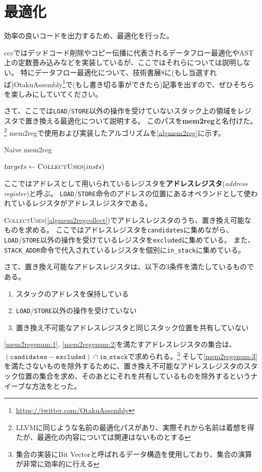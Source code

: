 \documentclass[uplatex,a4paper]{jsarticle}
\begin{document}
\clearpage
\section{最適化}
\label{optimization}

効率の良いコードを出力するため、最適化を行った。

cccではデッドコード削除やコピー伝播に代表されるデータフロー最適化やAST上の定数畳み込みなどを実装しているが、ここではそれらについては説明しない。
特にデータフロー最適化について、技術書展8に(もし当選すれば)OtakuAssembly\footnote{\url{https://twitter.com/OtakuAssembly}}で(もし書き切る事ができたら)記事を出すので、ぜひそちらを楽しみにしていてください。

さて、ここでは\texttt{LOAD}/\texttt{STORE}以外の操作を受けていないスタック上の領域をレジスタで置き換える最適化について説明する。
このパスを\textbf{mem2reg}と名付けた。\footnote{LLVMに同じような名前の最適化パスがあり、実際それから名前は着想を得たが、最適化の内容については関連はないものとする}
mem2regで使用および実装したアルゴリズムを\cref{algmem2reg}に示す。

\begin{algorithm}[h]
\caption{Naive mem2reg}\label{algmem2reg}
\begin{algorithmic}[1]
  \State $targets \gets \Call{CollectUses}{insts}$
  \State {}
\EndProcedure
\end{algorithmic}
\end{algorithm}

ここではアドレスとして用いられているレジスタを\textbf{アドレスレジスタ}(\textit{address register})と呼ぶ。
\texttt{LOAD}/\texttt{STORE}命令のアドレスの位置にあるオペランドとして使われているレジスタがアドレスレジスタである。

\textsc{CollectUses}(\cref{algmem2regcollect})でアドレスレジスタのうち、置き換え可能なものを求める。
ここではアドレスレジスタを\texttt{candidates}に集めながら、\texttt{LOAD}/\texttt{STORE}以外の操作を受けているレジスタを\texttt{excluded}に集めている。
また、\texttt{STACK\_ADDR}命令で代入されているレジスタを個別に\texttt{in\_stack}に集めている。

さて、置き換え可能なアドレスレジスタは、以下の3条件を満たしているものである。
\begin{enumerate}
  \item \label{mem2regenum:1}スタックのアドレスを保持している
  \item \label{mem2regenum:2}\texttt{LOAD}/\texttt{STORE}以外の操作を受けていない
  \item \label{mem2regenum:3}置き換え不可能なアドレスレジスタと同じスタック位置を共有していない
\end{enumerate}
\cref{mem2regenum:1}, \cref{mem2regenum:2}を満たすアドレスレジスタの集合は、$(\texttt{candidates} - \texttt{excluded}) \cap {\texttt{in\_stack}}$で求められる。\footnote{集合の実装にBit Vectorと呼ばれるデータ構造を使用しており、集合の演算が非常に効率的に行える}
そして\cref{mem2regenum:3}を満たさないものを除外するために、置き換え不可能なアドレスレジスタのスタック位置の集合を求め、そのあとにそれを共有しているものを除外するというナイーブな方法をとった。
\end{document}
